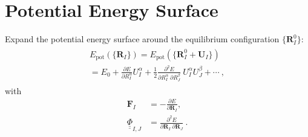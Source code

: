 \documentclass[nofootinbib,preprintnumbers,amsmath,amssymb,twocolumn]{revtex4-1}
\renewcommand{\b}[1]{\boldsymbol{#1}}
\renewcommand{\t}[1]{\text{#1}}
\newcommand{\nid}{\noindent}
\newcommand{\halb}{\frac{1}{2}}
\newcommand{\uunderline}[1]{\underline{\underline{{#1}}}}
\begin{document}
\section{Potential Energy Surface}
\nid
Expand the potential energy surface around the equilibrium configuration
$\{ \b R_I^0 \}$:
\begin{align}
\begin{split}
	E_\t{pot}( \{ \b R_I \}) = E_\t{pot}( \{ \b R_I^0 + \b U_I \}) \\
	= E_0 + \frac{\partial E}{\partial R_I^\alpha} U_I^\alpha
	+ \halb \frac{\partial^2 E}{\partial R_I^\alpha~\partial R_J^\beta} 
	~ U_I^\alpha U_J^\beta
	+ \cdots~,
\end{split}
\end{align}
with
\begin{align}
	\b F_I &= - \frac{\partial E}{\partial \b R_I}, \\
	\uunderline{\Phi}_{I,J}	&= \frac{\partial^2 E}{\partial \b R_I ~ \partial \b R_J}~.
\end{align}




\end{document}
